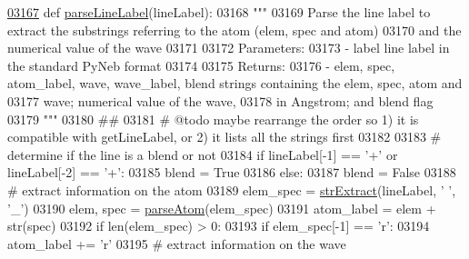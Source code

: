 \begin{DoxyCode}
\hypertarget{namespacepyneb_1_1core_1_1pynebcore_l03167}{}\hyperlink{namespacepyneb_1_1core_1_1pynebcore_a9fa8b0b7efdd4da21a816641bf17dcc7}{03167} \textcolor{keyword}{def }\hyperlink{namespacepyneb_1_1core_1_1pynebcore_a9fa8b0b7efdd4da21a816641bf17dcc7}{parseLineLabel}(lineLabel):
03168     \textcolor{stringliteral}{"""}
03169 \textcolor{stringliteral}{    Parse the line label to extract the substrings referring to the atom (elem, spec and atom)}
03170 \textcolor{stringliteral}{    and the numerical value of the wave}
03171 \textcolor{stringliteral}{    }
03172 \textcolor{stringliteral}{    Parameters:}
03173 \textcolor{stringliteral}{        - label    line label in the standard PyNeb format}
03174 \textcolor{stringliteral}{    }
03175 \textcolor{stringliteral}{    Returns:}
03176 \textcolor{stringliteral}{        - elem, spec, atom\_label, wave, wave\_label, blend  strings containing the elem, spec, atom and }
03177 \textcolor{stringliteral}{                                                              wave; numerical value of the wave, }
03178 \textcolor{stringliteral}{                                                              in Angstrom; and blend flag }
03179 \textcolor{stringliteral}{    """}
03180     \textcolor{comment}{##}
03181     \textcolor{comment}{# @todo maybe rearrange the order so 1) it is compatible with getLineLabel, or 2) it lists all the
       strings first }
03182 
03183     \textcolor{comment}{# determine if the line is a blend or not}
03184     \textcolor{keywordflow}{if} lineLabel[-1] == \textcolor{stringliteral}{'+'}  \textcolor{keywordflow}{or} lineLabel[-2] == \textcolor{stringliteral}{'+'}:
03185         blend = \textcolor{keyword}{True}
03186     \textcolor{keywordflow}{else}:
03187         blend = \textcolor{keyword}{False}
03188     \textcolor{comment}{# extract information on the atom}
03189     elem\_spec = \hyperlink{namespacepyneb_1_1utils_1_1misc_aaf9c5249e3c3104e38854ca30f9df4b7}{strExtract}(lineLabel, \textcolor{stringliteral}{' '}, \textcolor{stringliteral}{'\_'})
03190     elem, spec = \hyperlink{namespacepyneb_1_1utils_1_1misc_a8c069186002a3e73dd474958e35034d5}{parseAtom}(elem\_spec)
03191     atom\_label = elem + str(spec)
03192     \textcolor{keywordflow}{if} len(elem\_spec) > 0:
03193         \textcolor{keywordflow}{if} elem\_spec[-1] == \textcolor{stringliteral}{'}\textcolor{stringliteral}{r':}
03194 \textcolor{stringliteral}{            atom\_label += }\textcolor{stringliteral}{'}\textcolor{stringliteral}{r'}
03195 \textcolor{stringliteral}{    }\textcolor{comment}{# extract information on the wave}

\end{DoxyCode}
